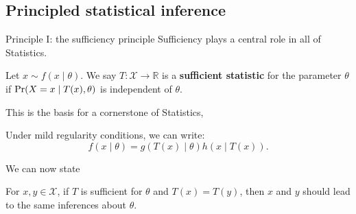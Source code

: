\subsection{Principled statistical inference}
\begin{frame}{Principle I: the sufficiency principle}
Sufficiency plays a central role in all of Statistics.
\begin{defn}
 Let $x \sim f(x \mid \theta)$.
 We say $T : \mathcal{X} \to \mathbb{R}$ is a \textbf{sufficient statistic} for the parameter $\theta$ if $\operatorname{Pr}(X = x \mid T(x), \theta)$ is independent of $\theta$.
\end{defn}
This is the basis for a cornerstone of Statistics, 
\begin{theo}
 Under mild regularity conditions, we can write:
 $$ f(x \mid \theta) = g(T(x) \mid \theta) h(x \mid T(x)).$$
\end{theo}
We can now state
\begin{idea}
\label{idea:SP}
 For $x, y \in \mathcal{X}$, if $T$ is sufficient for $\theta$ and $T(x) = T(y)$, then $x$ and $y$ should lead to the same inferences about $\theta$.
\end{idea}
\end{frame}

